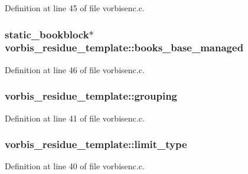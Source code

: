 Definition at line 45 of file vorbisenc.\+c.

\subsubsection[{\texorpdfstring{books\+\_\+base\+\_\+managed}{books_base_managed}}]{ {\bf static\+\_\+bookblock}$\ast$ vorbis\+\_\+residue\+\_\+template\+::books\+\_\+base\+\_\+managed}\hypertarget{structvorbis__residue__template_a3d33d8f56cfa34dac0c33e11e8323ab6}{}\label{structvorbis__residue__template_a3d33d8f56cfa34dac0c33e11e8323ab6}


Definition at line 46 of file vorbisenc.\+c.

\subsubsection[{\texorpdfstring{grouping}{grouping}}]{ vorbis\+\_\+residue\+\_\+template\+::grouping}\hypertarget{structvorbis__residue__template_ad4e0d91b38da3a639e860eeb75fcd863}{}\label{structvorbis__residue__template_ad4e0d91b38da3a639e860eeb75fcd863}


Definition at line 41 of file vorbisenc.\+c.

\subsubsection[{\texorpdfstring{limit\+\_\+type}{limit_type}}]{ vorbis\+\_\+residue\+\_\+template\+::limit\+\_\+type}\hypertarget{structvorbis__residue__template_a5da353b9dcda20f8e4e7a4f6087675a0}{}\label{structvorbis__residue__template_a5da353b9dcda20f8e4e7a4f6087675a0}


Definition at line 40 of file vorbisenc.\+c.


